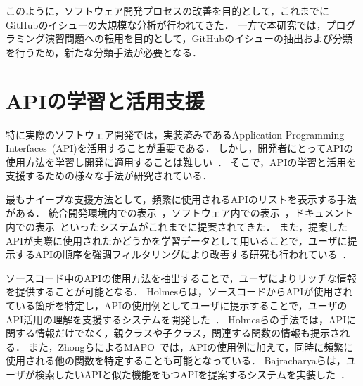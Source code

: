 このように，ソフトウェア開発プロセスの改善を目的として，これまでにGitHubのイシューの大規模な分析が行われてきた．
一方で本研究では，プログラミング演習問題への転用を目的として，GitHubのイシューの抽出および分類を行うため，新たな分類手法が必要となる．



\section{APIの学習と活用支援}

特に実際のソフトウェア開発では，実装済みであるApplication Programming Interfaces~(API)を活用することが重要である．
しかし，開発者にとってAPIの使用方法を学習し開発に適用することは難しい~\cite{robillard2011field}．
そこで，APIの学習と活用を支援するための様々な手法が研究されている．

最もナイーブな支援方法として，頻繁に使用されるAPIのリストを表示する手法がある．
統合開発環境内での表示~\cite{Holmes_2008_MSR_Eclipse_APIs}，ソフトウェア内での表示~\cite{UIST_2009_CommunityCommands}，ドキュメント内での表示~\cite{VLHCC_2009_API_doc_API_usage}といったシステムがこれまでに提案されてきた．
また，提案したAPIが実際に使用されたかどうかを学習データとして用いることで，ユーザに提示するAPIの順序を強調フィルタリングにより改善する研究も行われている~\cite{colab_filtering_api_recommend}．

ソースコード中のAPIの使用方法を抽出することで，ユーザによりリッチな情報を提供することが可能となる．
Holmesらは，ソースコードからAPIが使用されている箇所を特定し，APIの使用例としてユーザに提示することで，ユーザのAPI活用の理解を支援するシステムを開発した~\cite{Holmes_2006_recommend_api_example}．
Holmesらの手法では，APIに関する情報だけでなく，親クラスや子クラス，関連する関数の情報も提示される．
また，ZhongらによるMAPO~\cite{extended_MAPO}では，APIの使用例に加えて，同時に頻繁に使用される他の関数を特定することも可能となっている．
Bajracharyaらは，ユーザが検索したいAPIと似た機能をもつAPIを提案するシステムを実装した~\cite{Bajracharya:2010:LUS}．

